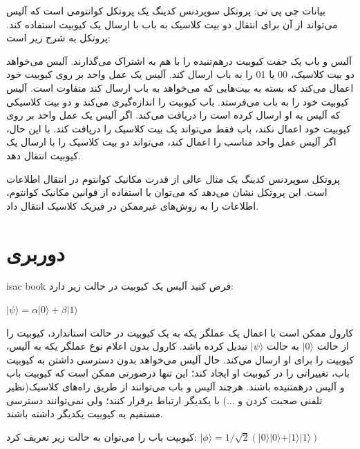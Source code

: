 \documentclass{book}
\begin{document}
بیانات چی پی تی:
پروتکل سوپردنس کدینگ یک پروتکل کوانتومی است که آلیس می‌تواند از آن برای انتقال دو بیت کلاسیک به باب با ارسال یک کیوبیت استفاده کند. پروتکل به شرح زیر است:

آلیس و باب یک جفت کیوبیت درهم‌تنیده را با هم به اشتراک می‌گذارند.
آلیس می‌خواهد دو بیت کلاسیک، 00 یا 01 را به باب ارسال کند.
آلیس یک عمل واحد بر روی کیوبیت خود اعمال می‌کند که بسته به بیت‌هایی که می‌خواهد به باب ارسال کند متفاوت است.
آلیس کیوبیت خود را به باب می‌فرستد.
باب کیوبیت را اندازه‌گیری می‌کند و دو بیت کلاسیکی که آلیس به او ارسال کرده است را دریافت می‌کند.
اگر آلیس یک عمل واحد بر روی کیوبیت خود اعمال نکند، باب فقط می‌تواند یک بیت کلاسیک را دریافت کند. با این حال، اگر آلیس عمل واحد مناسب را اعمال کند، می‌تواند دو بیت کلاسیک را با ارسال یک کیوبیت انتقال دهد.

پروتکل سوپردنس کدینگ یک مثال عالی از قدرت مکانیک کوانتوم در انتقال اطلاعات است. این پروتکل نشان می‌دهد که می‌توان با استفاده از قوانین مکانیک کوانتوم، اطلاعات را به روش‌های غیرممکن در فیزیک کلاسیک انتقال داد.
\newpage
\section{دوربری}
isac book
فرض کنید آلیس یک کیوبیت در حالت زیر دارد:
\begin{center}
$\vert \psi \rangle = \alpha\vert 0 \rangle + \beta\vert 1 \rangle $\\	
\end{center}

	کارول ممکن است با اعمال یک عملگر یکه‌ به یک کیوبیت در حالت استاندارد، کیوبیت را از حالت $\vert0\rangle$ به حالت $\vert\psi\rangle$  تبدیل کرده باشد. کارول بدون اعلام نوع عملگر یکه به آلیس،‌ کیوبیت را برای او ارسال می‌کند. 
	حال آلیس می‌خواهد بدون دسترسی داشتن به کیوبیت باب، تغییراتی را در کیوبیت او ایجاد کند؛ این تنها درصورتی ممکن است که کیوبیت باب و آلیس درهمتنیده باشند. هرچند آلیس و باب می‌توانند از طریق راه‌های کلاسیک(نظیر تلفنی صحبت کردن و ...) با یکدیگر ارتباط برقرار کنند؛ ولی نمی‌توانند دسترسی مستقیم به کیوبیت یکدیگر داشته باشند. 
	
	کیوبیت باب را می‌توان به حالت زیر تعریف کرد:
$\vert\phi\rangle = 1/\sqrt{2}(\vert0\rangle \vert0\rangle + \vert1\rangle\vert1\rangle)$ 
	
\end{document}
